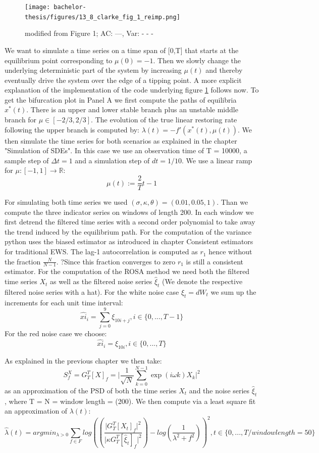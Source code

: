 \documentclass[%
thesis=student,%
coverpage=false,%
titlepage=false,%
headmarks=true, %
german,%
font=libertine, %
math=newpxtx, %
BCOR=5mm,%
coverBCOR=11mm%
]{tumbook}
\begin{document}
\begin{figure}
    \centering
    \texttt{[image: bachelor-thesis/figures/13\_8\_clarke\_fig\_1\_reimp.png]}
    \caption{modified from \cite{Clarke:2023} Figure 1; AC: ---, Var: - - -}
    \label{success_of_trad_ews_and_rosa}
\end{figure}

We want to simulate a time series on a time span of [0,T] that starts at the equilibrium point corresponding to $\mu(0) = -1$. Then we slowly change the underlying deterministic part of the system by increasing $\mu(t)$ and thereby eventually drive the system over the edge of a tipping point. A more explicit explanation of the implementation of the code underlying figure \ref{success_of_trad_ews_and_rosa} follows now. To get the bifurcation plot in Panel A we first compute the paths of equilibria $x^{*}(t)$. There is an upper and lower stable branch plus an unstable middle branch for $\mu \in [-2/3,2/3]$. The evolution of the true linear restoring rate following the upper branch is computed by: $\lambda(t) = -f'(x^{*}(t),\mu(t))$. We then simulate the time series for both scenarios as explained in the chapter "Simulation of SDEs". In this case we use an observation time of T = 10000, a sample step of $\Delta t = 1$ and a simulation step of $dt = 1/10$. We use a linear ramp for $\mu:  [-1,1] \rightarrow \mathbb{R}$:
\[
\mu(t) := \frac{2}{T}t-1
\]

For simulating both time series we used $(\sigma,\kappa,\theta) = (0.01,0.05,1)$. 
Than we compute the three indicator series on windows of length 200. In each window we first detrend the filtered time series with a second order polynomial to take away the trend induced by the equilibrium path. For the computation of the variance python uses the biased estimator as introduced in chapter Consistent estimators for traditional EWS. The lag-1 autocorrelation is computed as $r_{1}$ hence without the fraction $\frac{N}{N-1}$. ?Since this fraction converges to zero $r_{1}$ is still a consistent estimator. For the computation of the ROSA method we need both the filtered time series $X_{t}$ as well as the filtered noise series $\hat{\xi}_{t}$ (We denote the respective filtered noise series with a hat). For the white noise case $\xi_{t} = dW_{t}$ we sum up the increments for each unit time interval:
\[
\hat{xi}_{i} = \sum_{j = 0}^{9}\xi_{10i+j}, i \in \{0,...,T-1\}
\]
For the red noise case we choose:
\[
\hat{xi}_{i} = \xi_{10i}, i \in \{0,...,T\}
\]

As explained in the previous chapter we then take:
\[
S_{f}^{X} = G_{T}^{T}[X]_{f} = \lvert \frac{1}{\sqrt{N}}\sum_{k=0}^{N-1}\exp(i\omega k)X_{k} \rvert ^2
\]
as an approximation of the PSD of both the time series $X_{t}$ and the noise series $\hat{\xi}_{t}$, where T = N = window length = (200). We then compute via a least square fit an approximation of $\lambda(t)$:
\[
\hat{\lambda}(t) = argmin_{\lambda > 0} \sum_{f \in F} log((\frac{\lvert G_{T}^{T}[X_{t}]_{f}\rvert^2}{\lvert \kappa G_{T}^{T}[\hat{\xi}_{t}]_{f} \rvert^2}) - log(\frac{1}{\lambda^2 + f^2}))^2, t \in \{0,...,T/window length = 50\}
\]
\end{document}

